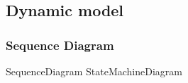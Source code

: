
\subsection{Dynamic model}

\subsubsection*{Sequence Diagram}
{SequenceDiagram}
{StateMachineDiagram}